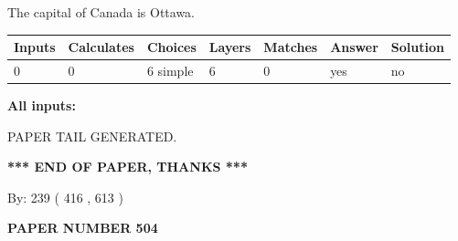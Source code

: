 \documentclass[12pt]{article}
\begin{document}
 
The capital of Canada is Ottawa.
 
 
\noindent{}
 
 
   
   
   
   
\noindent\begin{tabular}{|l|l|l|l|l|l|l|}
 \hline
Inputs & Calculates & Choices & Layers & Matches & Answer & Solution \\ \hline
 0  & 
 0  & 
 6
  simple  
  & 
 6  & 
 0  & 
  yes & 
  no 
  \\ \hline
 \end{tabular}
   
   
   
   
\noindent{}
   
   
   
   
\noindent\vspace{0.1in}\hspace{-0.08in} {\textbf{\Large{All inputs: }}}
   
   
   
   
   
   
 \vspace{0.2in}
 
   
   
\vspace{2.0in} PAPER TAIL GENERATED.
   
   
   
   
\vspace{1.0in} 
{\textbf{\large{ *** END OF PAPER, THANKS *** }}} 
   
   
\hspace{1.0in} By: 
 239 ( 416 ,  613 )
   
   
   
   
\newpage 
\setcounter{page}{ 
   504001 } 
   
   
   
   
 {\textbf{ \Large{ PAPER NUMBER  504  }}}
   
   
\vspace{0.2in}
   
   
   
   
   
   
   
\end{document}
